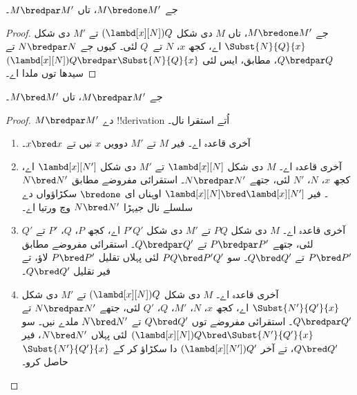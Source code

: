 \documentclass[../../../include/open-logic-section]{subfiles}
\begin{document}


\begin{lem}
  جے $M \bredone M'$، تاں $M \bredpar M'$۔
\end{lem}
\begin{proof} جے $M \bredone M'$، تاں $M$ دی شکل
    $(\lambd[x][N])Q$ تے $M'$ دی شکل $\Subst{N}{Q}{x}$ اے،
    کجھ $x$، $N$ تے~$Q$ لئی۔ کیوں جے $N \bredpar N$ تے
    $Q \bredpar Q$،  مطابق، ایس لئی
    $(\lambd[x][N])Q
    \bredpar \Subst{N}{Q}{x}$ سیدھا
     توں ملدا اے۔
\end{proof}

\begin{lem}
  جے $M \bredpar M'$، تاں $M \bred M'$۔
\end{lem}

\begin{proof} $M \bredpar M'$ دے !!{derivation} اُتے استقرا نال۔
  \begin{enumerate}
  \item آخری قاعدہ  اے۔ فیر $M$ تے $M'$
    دوویں $x$ نیں تے $x \bred x$۔
  \item آخری قاعدہ  اے۔ $M$ دی شکل
    $\lambd[x][N]$ تے $M'$ دی شکل $\lambd[x][N']$ اے، کجھ
    $x$، $N$، $N'$ لئی، جتھے $N \bredpar N'$۔ استقرائی مفروضے
    مطابق $N \bred N'$۔ فیر $\lambd[x][N] \bred \lambd[x][N']$
    اوہناں ای $\bredone$ سکڑاؤواں دے سلسلے نال جیہڑا
    $N \bred N'$ وچ ورتیا اے۔
  \item آخری قاعدہ  اے۔ $M$ دی شکل
    $PQ$ تے $M'$ دی شکل $P'Q'$ اے، کجھ $P$، $Q$، $P'$ تے
    $Q'$ لئی، جتھے $P \bredpar P'$ تے $Q \bredpar Q'$۔
    استقرائی مفروضے مطابق $P \bred P'$ تے $Q \bred
    Q'$۔ سو $PQ \bred P'Q'$ لئی پہلاں تقلیل $P \bred P'$
    لاؤ، تے فیر تقلیل $Q \bred Q'$۔
  \item آخری قاعدہ  اے۔ $M$ دی شکل
    $(\lambd[x][N])Q$ تے $M'$ دی شکل $\Subst{N'}{Q'}{x}$ اے،
    کجھ $x$، $N$، $M'$، $Q$، $Q'$ لئی، جتھے $N \bredpar N'$
    تے $Q \bredpar Q'$۔ استقرائی مفروضے توں $Q \bred Q'$ تے
    $N \bred N'$ ملدے نیں۔ سو $(\lambd[x][N])Q \bred \Subst{N'}{Q'}{x}$
    لئی پہلاں $N \bred N'$، فیر $Q \bred Q'$، تے آخر
    $(\lambd[x][N'])Q'$ دا سکڑاؤ کر کے $\Subst{N'}{Q'}{x}$ حاصل کرو۔
  \end{enumerate}
\end{proof}
\end{document}

